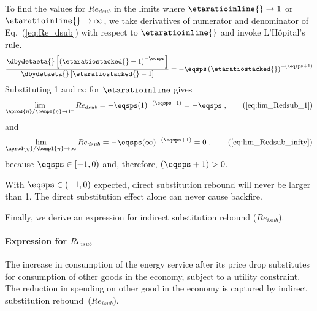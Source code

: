 To find the values for $Re_{dsub}$ in the limits where $\etaratioinline{} \to 1$ or 
$\etaratioinline{} \to \infty$, we take derivatives of numerator and denominator
of Eq.~(\ref{eq:Re_dsub}) with respect to $\etaratioinline{}$ and invoke L'H\^{o}pital's rule.
%
\begin{equation}
  \frac{\dbydetaeta{}\left[ \left( \etaratiostacked{} - 1 \right)^{-\eqsps}  \right]}
           {\dbydetaeta{}\left[ \etaratiostacked{} - 1\right]}
    = -\eqsps \left( \etaratiostacked{} \right)^{-(\eqsps + 1)}
\end{equation}
%
Substituting 1 and $\infty$ for $\etaratioinline$ gives
%
\begin{equation}
  \lim_{\aprod{\eta}/\bempl{\eta} \to 1^{\!+}} Re_{dsub} 
    = -\eqsps ( 1 )^{-(\eqsps + 1)}
    = -\eqsps \; ,                               \tag{\ref{eq:lim_Redsub_1}}
\end{equation}
%
and
%
\begin{equation}
  \lim_{\aprod{\eta}/\bempl{\eta} \to \infty} Re_{dsub} 
    = -\eqsps ( \infty )^{-(\eqsps + 1)}
    = 0 \; ,                                              \tag{\ref{eq:lim_Redsub_infty}}
\end{equation}
%
because $\eqsps \in [-1, 0)$ and, therefore, $(\eqsps + 1) > 0$.

With $\eqsps \in (-1, 0)$ expected,
direct substitution rebound will never be larger than 1.
The direct substitution effect alone
can never cause backfire. 

Finally, we derive an expression for indirect substitution rebound ($Re_{isub}$).


\paragraph{Expression for $Re_{isub}$}
\label{sec:Re_isub}

The increase in consumption of the energy service after its price drop
substitutes for consumption of other goods in the economy,
subject to a utility constraint.
The reduction in spending on other good in the economy
is captured by indirect substitution rebound~($Re_{isub}$).

